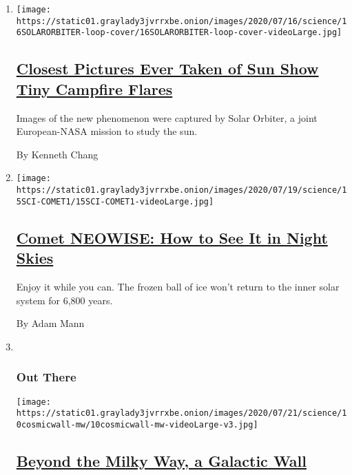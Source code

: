 \begin{enumerate}
\def\labelenumi{\arabic{enumi}.}
\item
  \texttt{[image: https://static01.graylady3jvrrxbe.onion/images/2020/07/16/science/16SOLARORBITER-loop-cover/16SOLARORBITER-loop-cover-videoLarge.jpg]}

  \hypertarget{closest-pictures-ever-taken-of-sun-show-tiny-campfire-flares}{%
  \subsection{\texorpdfstring{\href{/2020/07/16/science/solar-orbiter-sun-images.html}{Closest
  Pictures Ever Taken of Sun Show Tiny Campfire
  Flares}}{Closest Pictures Ever Taken of Sun Show Tiny Campfire Flares}}\label{closest-pictures-ever-taken-of-sun-show-tiny-campfire-flares}}

  Images of the new phenomenon were captured by Solar Orbiter, a joint
  European-NASA mission to study the sun.

  By Kenneth Chang
\item
  \texttt{[image: https://static01.graylady3jvrrxbe.onion/images/2020/07/19/science/15SCI-COMET1/15SCI-COMET1-videoLarge.jpg]}

  \hypertarget{comet-neowise-how-to-see-it-in-night-skies}{%
  \subsection{\texorpdfstring{\href{/article/neowise-comet.html}{Comet
  NEOWISE: How to See It in Night
  Skies}}{Comet NEOWISE: How to See It in Night Skies}}\label{comet-neowise-how-to-see-it-in-night-skies}}

  Enjoy it while you can. The frozen ball of ice won't return to the
  inner solar system for 6,800 years.

  By Adam Mann
\item ~
  \hypertarget{out-there-1}{%
  \subsubsection{Out There}\label{out-there-1}}

  \texttt{[image: https://static01.graylady3jvrrxbe.onion/images/2020/07/21/science/10cosmicwall-mw/10cosmicwall-mw-videoLarge-v3.jpg]}

  \hypertarget{beyond-the-milky-way-a-galactic-wall}{%
  \subsection{\texorpdfstring{\href{/2020/07/10/science/astronomy-galaxies-attractor-universe.html}{Beyond
  the Milky Way, a Galactic
  Wall}}{Beyond the Milky Way, a Galactic Wall}}\label{beyond-the-milky-way-a-galactic-wall}}


\end{enumerate}
